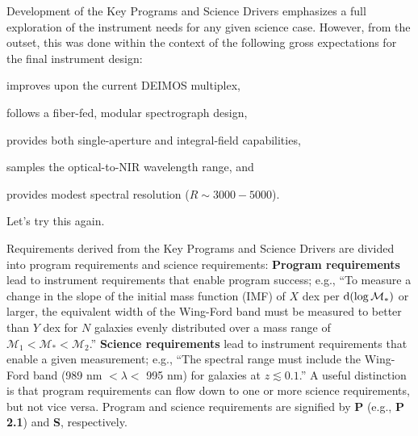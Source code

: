 \documentclass[11pt,a4paper,twoside,onecolumn,openany,final,oldfontcommands]{memoir}
\begin{document}
Development of the Key Programs and Science Drivers emphasizes a full exploration of the instrument needs for any given science case.  However, from the outset, this was done within the context of the following gross expectations for the final instrument design:
%
\begin{asparaenum}
\item improves upon the current DEIMOS multiplex,
\item follows a fiber-fed, modular spectrograph design,
\item provides both single-aperture and integral-field capabilities,
\item samples the optical-to-NIR wavelength range, and
\item provides modest spectral resolution ($R\sim 3000-5000$).
\end{asparaenum}



Let's try this again.

Requirements derived from the Key Programs and Science Drivers are divided into program requirements and science requirements:  \textbf{Program requirements} lead to instrument requirements that enable program success; e.g., ``To measure a change in the slope of the initial mass function (IMF) of $X$ dex per ${\rm d}(\log\mathcal{M}_\ast)$ or larger, the equivalent width of the Wing-Ford band must be measured to better than $Y$ dex for $N$ galaxies evenly distributed over a mass range of $\mathcal{M}_1 < \mathcal{M}_\ast < \mathcal{M}_2$.''  \textbf{Science requirements} lead to instrument requirements that enable a given measurement; e.g., ``The spectral range must include the Wing-Ford band (989 nm $< \lambda <$ 995 nm) for galaxies at $z \lesssim 0.1$.''    A useful distinction is that program requirements can flow down to one or more science requirements, but not vice versa. Program and science requirements are signified by \textbf{P} (e.g., \textbf{P 2.1}) and \textbf{S}, respectively.
\end{document}
